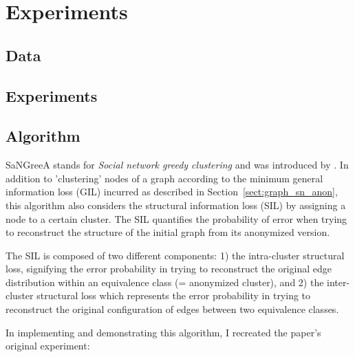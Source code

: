 \documentclass{llncs}
\begin{document}
\section{Experiments}
\label{sect:experiments}


\subsection{Data} 
\label{ssect:data}


\subsection{Experiments}
\label{ssect:experiments}


\subsection{Algorithm}
\label{ssect:algorithm}


SaNGreeA stands for \textit{Social network greedy clustering} and was introduced by \cite{campan2009data}. In addition to 'clustering' nodes of a graph according to the minimum general information loss (GIL) incurred as described in Section~\ref{sect:graph_sn_anon}, this algorithm also considers the structural information loss (SIL) by assigning a node to a certain cluster. The SIL quantifies the probability of error when trying to reconstruct the structure of the initial graph from its anonymized version.

The SIL is composed of two different components: 1) the intra-cluster structural loss, signifying the error probability in trying to reconstruct the original edge distribution within an equivalence class (= anonymized cluster), and 2) the inter-cluster structural loss which represents the error probability in trying to reconstruct the original configuration of edges between two equivalence classes.

In implementing and demonstrating this algorithm, I recreated the paper's original experiment:
\end{document}
